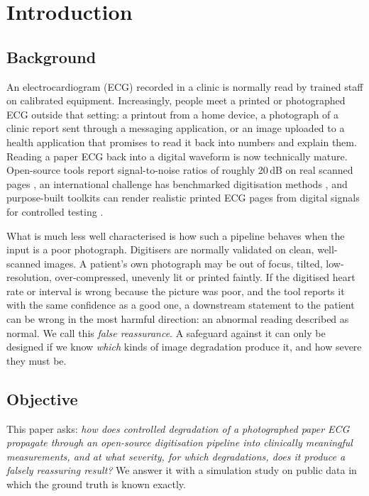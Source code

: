 \section{Introduction}

\subsection{Background}
An electrocardiogram (ECG) recorded in a clinic is normally read by trained staff on calibrated equipment. Increasingly, people meet a printed or photographed ECG outside that setting: a printout from a home device, a photograph of a clinic report sent through a messaging application, or an image uploaded to a health application that promises to read it back into numbers and explain them. Reading a paper ECG back into a digital waveform is now technically mature. Open-source tools report signal-to-noise ratios of roughly 20\,dB on real scanned pages \citep{ref5}, an international challenge has benchmarked digitisation methods \citep{ref2}, and purpose-built toolkits can render realistic printed ECG pages from digital signals for controlled testing \citep{ref1}.

What is much less well characterised is how such a pipeline behaves when the input is a poor photograph. Digitisers are normally validated on clean, well-scanned images. A patient's own photograph may be out of focus, tilted, low-resolution, over-compressed, unevenly lit or printed faintly. If the digitised heart rate or interval is wrong because the picture was poor, and the tool reports it with the same confidence as a good one, a downstream statement to the patient can be wrong in the most harmful direction: an abnormal reading described as normal. We call this \emph{false reassurance}. A safeguard against it can only be designed if we know \emph{which} kinds of image degradation produce it, and how severe they must be.

\subsection{Objective}
This paper asks: \emph{how does controlled degradation of a photographed paper ECG propagate through an open-source digitisation pipeline into clinically meaningful measurements, and at what severity, for which degradations, does it produce a falsely reassuring result?} We answer it with a simulation study on public data in which the ground truth is known exactly.

